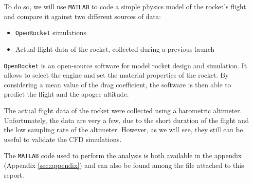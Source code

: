 To do so, we will use \texttt{MATLAB} to code a simple physics model of the rocket's flight and compare it against two different sources of data:

\begin{itemize}
    \item \texttt{OpenRocket} simulations
    \item Actual flight data of the rocket, collected during a previous launch
\end{itemize}

\texttt{OpenRocket} is an open-source software for model rocket design and simulation.
It allows to select the engine and set the material properties of the rocket.
By considering a mean value of the drag coefficient, the software is then able to predict the flight and the apogee altitude.

The actual flight data of the rocket were collected using a barometric altimeter.
Unfortunately, the data are very a few, due to the short duration of the flight and the low sampling rate of the altimeter.
However, as we will see, they still can be useful to validate the CFD simulations.

The \texttt{MATLAB} code used to perform the analysis is both available in the appendix (Appendix \ref{sec:appendix}) and can also be found among the file attached to this report.